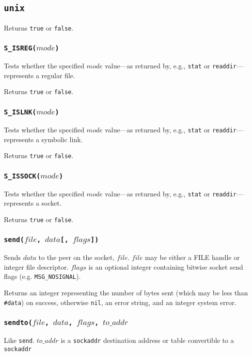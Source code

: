 \documentclass[11pt, oneside]{memoir}
\newcommand*{\true}[0]{\texttt{true}\xspace}
\newcommand*{\false}[0]{\texttt{false}\xspace}
\newcommand*{\nil}[0]{\texttt{nil}\xspace}
\newcommand*{\syscall}[1]{\texttt{#1}\xspace}
\newcommand*{\fn}[1]{\texttt{#1}\xspace}
\newcommand*{\otherwise}[1]{otherwise #1, an error string, and an integer system error}
\newcommand*{\sockaddr}[0]{\texttt{sockaddr}\xspace}
\newcounter{toccols}
\newenvironment{Module}[1]{
	\subsection{\texttt{#1}}
	\addtocontents{toc}{
		\protect\begin{multicols}{\value{toccols}}
	}
}{
	\addtocontents{toc}{\protect\end{multicols}}
}
\begin{document}
\begin{Module}{unix}
Returns \true or \false.

\subsubsection[\fn{S\_ISREG}]{\fn{S\_ISREG($mode$)}}

Tests whether the specified $mode$ value---as returned by, e.g., \syscall{stat} or \syscall{readdir}---represents a regular file.

Returns \true or \false.

\subsubsection[\fn{S\_ISLNK}]{\fn{S\_ISLNK($mode$)}}

Tests whether the specified $mode$ value---as returned by, e.g., \syscall{stat} or \syscall{readdir}---represents a symbolic link.

Returns \true or \false.

\subsubsection[\fn{S\_ISSOCK}]{\fn{S\_ISSOCK($mode$)}}

Tests whether the specified $mode$ value---as returned by, e.g., \syscall{stat} or \syscall{readdir}---represents a socket.

Returns \true or \false.

\subsubsection[\fn{send}]{\fn{send($file$, $data$[, $flags$])}}

Sends $data$ to the peer on the socket, $file$. $file$ may be either a FILE handle or integer file descriptor. $flags$ is an optional integer containing bitwise socket send flags (e.g. \texttt{MSG\_NOSIGNAL}).

Returns an integer representing the number of bytes sent (which may be less than \texttt{\#data}) on success, \otherwise{\nil}.

\subsubsection[\fn{sendto}]{\fn{sendto($file$, $data$, $flags$, $to\_addr$}}

Like \syscall{send}. $to\_addr$ is a \sockaddr destination address or table convertible to a \sockaddr


\end{Module}
\end{document}
